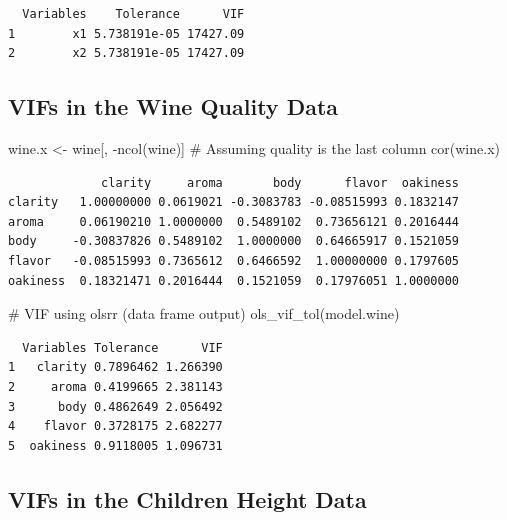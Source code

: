 \documentclass[
  letterpaper,
]{scrbook}
\newenvironment{Shaded}{\begin{snugshade}}{\end{snugshade}}
\newcommand{\CommentTok}[1]{\textcolor[rgb]{0.37,0.37,0.37}{#1}}
\newcommand{\FunctionTok}[1]{\textcolor[rgb]{0.28,0.35,0.67}{#1}}
\newcommand{\NormalTok}[1]{\textcolor[rgb]{0.00,0.23,0.31}{#1}}
\newcommand{\OtherTok}[1]{\textcolor[rgb]{0.00,0.23,0.31}{#1}}
\newcommand{\SpecialCharTok}[1]{\textcolor[rgb]{0.37,0.37,0.37}{#1}}
\begin{document}
\begin{verbatim}
  Variables    Tolerance      VIF
1        x1 5.738191e-05 17427.09
2        x2 5.738191e-05 17427.09
\end{verbatim}

\subsection{VIFs in the Wine Quality
Data}\label{vifs-in-the-wine-quality-data}

\begin{Shaded}
\begin{Highlighting}[]
\NormalTok{wine.x }\OtherTok{\textless{}{-}}\NormalTok{ wine[, }\SpecialCharTok{{-}}\FunctionTok{ncol}\NormalTok{(wine)] }\CommentTok{\# Assuming quality is the last column}
\FunctionTok{cor}\NormalTok{(wine.x)}
\end{Highlighting}
\end{Shaded}

\begin{verbatim}
             clarity     aroma       body      flavor  oakiness
clarity   1.00000000 0.0619021 -0.3083783 -0.08515993 0.1832147
aroma     0.06190210 1.0000000  0.5489102  0.73656121 0.2016444
body     -0.30837826 0.5489102  1.0000000  0.64665917 0.1521059
flavor   -0.08515993 0.7365612  0.6466592  1.00000000 0.1797605
oakiness  0.18321471 0.2016444  0.1521059  0.17976051 1.0000000
\end{verbatim}

\begin{Shaded}
\begin{Highlighting}[]
\CommentTok{\# VIF using olsrr (data frame output)}
\FunctionTok{ols\_vif\_tol}\NormalTok{(model.wine)}
\end{Highlighting}
\end{Shaded}

\begin{verbatim}
  Variables Tolerance      VIF
1   clarity 0.7896462 1.266390
2     aroma 0.4199665 2.381143
3      body 0.4862649 2.056492
4    flavor 0.3728175 2.682277
5  oakiness 0.9118005 1.096731
\end{verbatim}

\subsection{VIFs in the Children Height
Data}\label{vifs-in-the-children-height-data}
\end{document}

